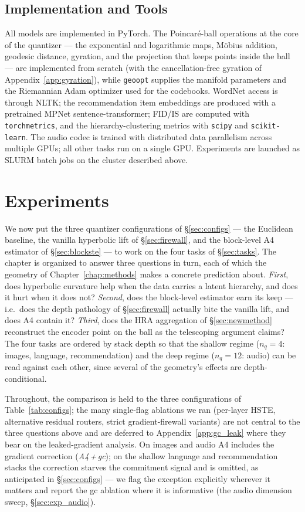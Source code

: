 \documentclass[12pt]{report}
\begin{document}
\section{Implementation and Tools}
\label{sec:tools}

All models are implemented in PyTorch. The Poincar\'e-ball operations at the core of the quantizer --- the exponential and logarithmic maps, M\"obius addition, geodesic distance, gyration, and the projection that keeps points inside the ball --- are implemented from scratch (with the cancellation-free gyration of Appendix~\ref{app:gyration}), while \texttt{geoopt} supplies the manifold parameters and the Riemannian Adam optimizer used for the codebooks. WordNet access is through NLTK; the recommendation item embeddings are produced with a pretrained MPNet sentence-transformer; FID/IS are computed with \texttt{torchmetrics}, and the hierarchy-clustering metrics with \texttt{scipy} and \texttt{scikit-learn}. The audio codec is trained with distributed data parallelism across multiple GPUs; all other tasks run on a single GPU. Experiments are launched as SLURM batch jobs on the cluster described above.

\chapter{Experiments}
\label{chap:experiments}

We now put the three quantizer configurations of \S\ref{sec:configs} --- the Euclidean baseline, the vanilla hyperbolic lift of \S\ref{sec:firewall}, and the block-level A4 estimator of \S\ref{sec:blockste} --- to work on the four tasks of \S\ref{sec:tasks}. The chapter is organized to answer three questions in turn, each of which the geometry of Chapter~\ref{chap:methods} makes a concrete prediction about. \emph{First}, does hyperbolic curvature help when the data carries a latent hierarchy, and does it hurt when it does not? \emph{Second}, does the block-level estimator earn its keep --- i.e.\ does the depth pathology of \S\ref{sec:firewall} actually bite the vanilla lift, and does A4 contain it? \emph{Third}, does the HRA aggregation of \S\ref{sec:newmethod} reconstruct the encoder point on the ball as the telescoping argument claims? The four tasks are ordered by stack depth so that the shallow regime ($n_q=4$: images, language, recommendation) and the deep regime ($n_q=12$: audio) can be read against each other, since several of the geometry's effects are depth-conditional.

Throughout, the comparison is held to the three configurations of Table~\ref{tab:configs}; the many single-flag ablations we ran (per-layer HSTE, alternative residual routers, strict gradient-firewall variants) are not central to the three questions above and are deferred to Appendix~\ref{app:gc_leak} where they bear on the leaked-gradient analysis. On images and audio A4 includes the gradient correction (\emph{A4\,+\,gc}); on the shallow language and recommendation stacks the correction starves the commitment signal and is omitted, as anticipated in \S\ref{sec:configs} --- we flag the exception explicitly wherever it matters and report the gc ablation where it is informative (the audio dimension sweep, \S\ref{sec:exp_audio}).
\end{document}
